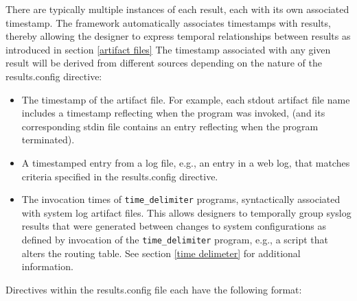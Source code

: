 \documentclass[12pt]{article}
\begin{document}
There are typically multiple instances of each result, each with its own associated timestamp. The framework automatically
associates timestamps with results, thereby allowing the designer to express temporal relationships between results
as introduced in section \ref{artifact files} The timestamp associated with any given result will be derived from different
sources depending on the nature of the results.config directive:
\begin{itemize}
\item The timestamp of the artifact file.  For example, each stdout artifact file name includes a timestamp reflecting when the
program was invoked, (and its corresponding stdin file contains an entry reflecting when the program terminated).
\item A timestamped entry from a log file, e.g., an entry in a web log, that matches criteria specified in the results.config
directive.
\item The invocation times of {\tt time\_delimiter} programs, syntactically associated with system log artifact files.
This allows designers to temporally group syslog results that were generated between changes to system configurations
as defined by invocation of the {\tt time\_delimiter} program, e.g., a script that alters the routing table.  See section 
\ref{time delimeter} for additional information. 
\end{itemize}

Directives within the results.config file each have the following format:
\end{document}
